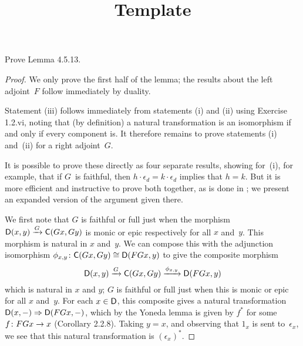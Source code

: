 \documentclass[../../solutions]{subfiles}
\title{Template}
\author{}
\begin{document}
\maketitle

%   

\begin{exercise}
  Prove Lemma 4.5.13.
\end{exercise}

\begin{proof}
  We only prove the first half of the lemma; the results about the
  left adjoint~$F$ follow immediately by duality.

  Statement (iii) follows immediately from statements (i) and (ii)
  using Exercise 1.2.vi, noting that (by definition) a natural
  transformation is an isomorphism if and only if every component is.
  It therefore remains to prove statements (i) and~(ii) for a right
  adjoint~$G$.

  It is possible to prove these directly as four separate results,
  showing for~(i), for example, that if $G$~is faithful, then
  $h\cdot\epsilon_d = k\cdot\epsilon_d$ implies that $h=k$.  But it is
  more efficient and instructive to prove both together, as is done in
  \cite[90--91]{catworking}; we present an expanded version of the
  argument given there.

  We first note that $G$ is faithful or full just when the morphism
  ${\mathsf{D}}(x,y)\xrightarrow{G} {\mathsf{C}}(Gx,Gy)$ is monic or epic respectively
  for all $x$ and~$y$.  This morphism is natural in $x$ and~$y$.  We
  can compose this with the adjunction isomorphism
  ${\phi_{x,y}}\colon{{\mathsf{C}}(Gx,Gy)}\cong{{\mathsf{D}}(FGx,y)}$ to give the composite
  morphism
  $${\mathsf{D}}(x,y)\xrightarrow{G} {\mathsf{C}}(Gx,Gy) \xrightarrow{\phi_{x,y}}
  {\mathsf{D}}(FGx,y)$$
  which is natural in $x$ and $y$; $G$ is faithful or full just when
  this is monic or epic for all $x$ and~$y$.  For each $x\in{\mathsf{D}}$, this
  composite gives a natural transformation ${\mathsf{D}}(x,-)\Rightarrow
  {\mathsf{D}}(FGx,-)$, which by the Yoneda lemma is given by $f^*$ for some
  ${f}\colon{FGx}\to{x}$ (Corollary 2.2.8).  Taking $y=x$, and observing
  that $1_x$ is sent to~$\epsilon_x$, we see that this natural
  transformation is $(\epsilon_x)^*$.


\end{proof}
\end{document}
